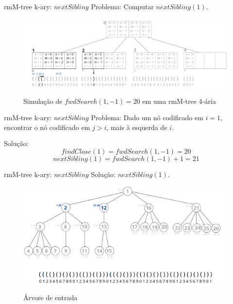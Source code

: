  \begin{frame}{rmM-tree k-ary: $nextSibling$}
    Problema: Computar $nextSibling(1)$.
     \begin{figure}[h!]
         \centering
         \includegraphics[scale=0.8]{images/rmm-tree-kary-fwd.png}\\
         \caption{Simulação de $fwdSearch(1,-1)=20$ em uma rmM-tree 4-ária}
     \end{figure} 
 \end{frame}


 \begin{frame}{rmM-tree k-ary: $nextSibling$}
    Problema: Dado um nó codificado em $i=1$, encontrar o nó codificado em $j>i$, mais à esquerda de $i$.

    Solução: 
    $$findClose(1) = fwdSearch(1,-1) = 20 $$ 
    $$nextSibling(1) = fwdSearch(1,-1) + 1 = 21 $$ 
 \end{frame}

 \begin{frame}{rmM-tree k-ary: $nextSibling$}
    Solução:  $nextSibling(1)$.
     \begin{figure}[h!]
         \centering
         \includegraphics[scale=0.40]{images/nextSibling-res.png}\\
         \caption{Árvore de entrada}
     \end{figure} 
 \end{frame}

